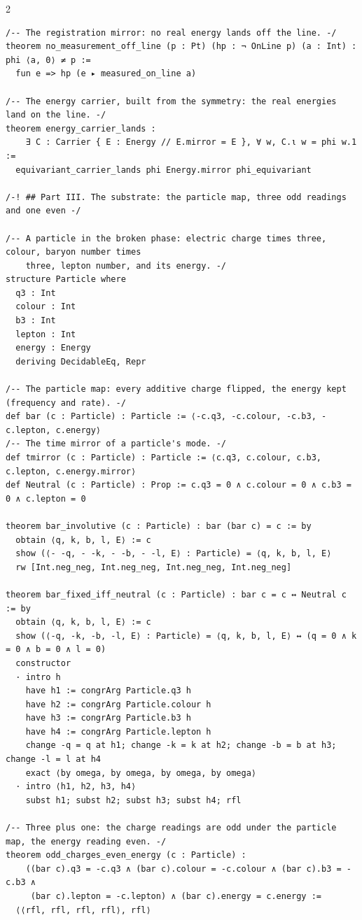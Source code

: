 \documentclass[10pt]{article}
\begin{document}
\begin{multicols}{2}
\begin{Verbatim}[fontsize=\fontsize{6.0}{6.9}\selectfont,breaklines,breakanywhere,breaksymbolleft={}]
/-- The registration mirror: no real energy lands off the line. -/
theorem no_measurement_off_line (p : Pt) (hp : ¬ OnLine p) (a : Int) : phi ⟨a, 0⟩ ≠ p :=
  fun e => hp (e ▸ measured_on_line a)

/-- The energy carrier, built from the symmetry: the real energies land on the line. -/
theorem energy_carrier_lands :
    ∃ C : Carrier { E : Energy // E.mirror = E }, ∀ w, C.ι w = phi w.1 :=
  equivariant_carrier_lands phi Energy.mirror phi_equivariant

/-! ## Part III. The substrate: the particle map, three odd readings and one even -/

/-- A particle in the broken phase: electric charge times three, colour, baryon number times
    three, lepton number, and its energy. -/
structure Particle where
  q3 : Int
  colour : Int
  b3 : Int
  lepton : Int
  energy : Energy
  deriving DecidableEq, Repr

/-- The particle map: every additive charge flipped, the energy kept (frequency and rate). -/
def bar (c : Particle) : Particle := ⟨-c.q3, -c.colour, -c.b3, -c.lepton, c.energy⟩
/-- The time mirror of a particle's mode. -/
def tmirror (c : Particle) : Particle := ⟨c.q3, c.colour, c.b3, c.lepton, c.energy.mirror⟩
def Neutral (c : Particle) : Prop := c.q3 = 0 ∧ c.colour = 0 ∧ c.b3 = 0 ∧ c.lepton = 0

theorem bar_involutive (c : Particle) : bar (bar c) = c := by
  obtain ⟨q, k, b, l, E⟩ := c
  show (⟨- -q, - -k, - -b, - -l, E⟩ : Particle) = ⟨q, k, b, l, E⟩
  rw [Int.neg_neg, Int.neg_neg, Int.neg_neg, Int.neg_neg]

theorem bar_fixed_iff_neutral (c : Particle) : bar c = c ↔ Neutral c := by
  obtain ⟨q, k, b, l, E⟩ := c
  show (⟨-q, -k, -b, -l, E⟩ : Particle) = ⟨q, k, b, l, E⟩ ↔ (q = 0 ∧ k = 0 ∧ b = 0 ∧ l = 0)
  constructor
  · intro h
    have h1 := congrArg Particle.q3 h
    have h2 := congrArg Particle.colour h
    have h3 := congrArg Particle.b3 h
    have h4 := congrArg Particle.lepton h
    change -q = q at h1; change -k = k at h2; change -b = b at h3; change -l = l at h4
    exact ⟨by omega, by omega, by omega, by omega⟩
  · intro ⟨h1, h2, h3, h4⟩
    subst h1; subst h2; subst h3; subst h4; rfl

/-- Three plus one: the charge readings are odd under the particle map, the energy reading even. -/
theorem odd_charges_even_energy (c : Particle) :
    ((bar c).q3 = -c.q3 ∧ (bar c).colour = -c.colour ∧ (bar c).b3 = -c.b3 ∧
     (bar c).lepton = -c.lepton) ∧ (bar c).energy = c.energy :=
  ⟨⟨rfl, rfl, rfl, rfl⟩, rfl⟩


\end{Verbatim}
\end{multicols}
\end{document}
